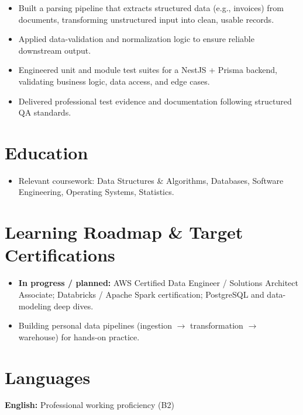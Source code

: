 \documentclass[10pt]{article}
\begin{document}
\begin{itemize}
  \item Built a parsing pipeline that extracts structured data (e.g., invoices) from documents, transforming unstructured input into clean, usable records.
  \item Applied data-validation and normalization logic to ensure reliable downstream output.
\end{itemize}

\begin{itemize}
  \item Engineered unit and module test suites for a NestJS + Prisma backend, validating business logic, data access, and edge cases.
  \item Delivered professional test evidence and documentation following structured QA standards.
\end{itemize}

\section{Education}
\begin{itemize}
  \item Relevant coursework: Data Structures \& Algorithms, Databases, Software Engineering, Operating Systems, Statistics.
\end{itemize}

\section{Learning Roadmap \& Target Certifications}
\begin{itemize}
  \item \textbf{In progress / planned:} AWS Certified Data Engineer / Solutions Architect Associate; Databricks / Apache Spark certification; PostgreSQL and data-modeling deep dives.
  \item Building personal data pipelines (ingestion $\rightarrow$ transformation $\rightarrow$ warehouse) for hands-on practice.
\end{itemize}

\section{Languages}
 \quad\textbullet\quad \textbf{English:} Professional working proficiency (B2)
\end{document}
